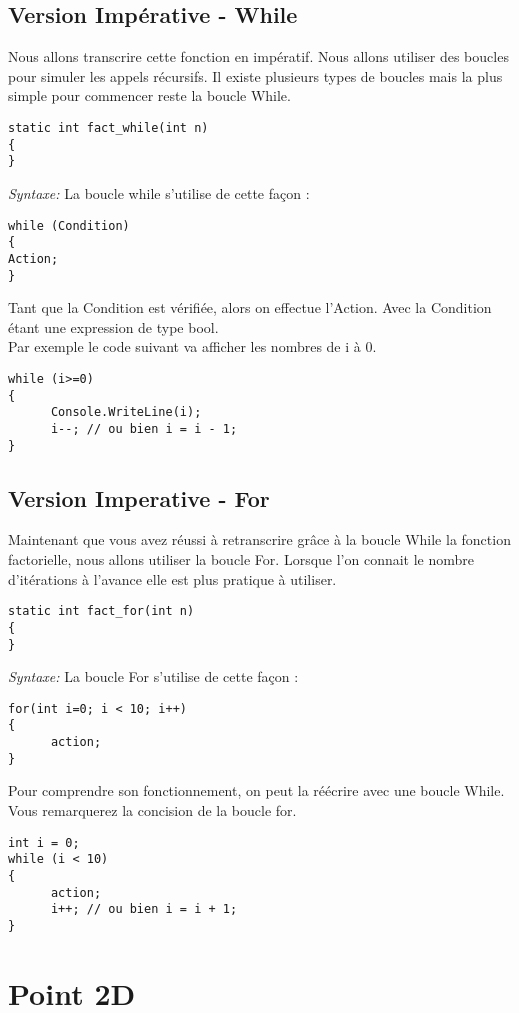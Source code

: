 \documentclass[12pt,a4paper]{report}
\begin{document}
\subsection{Version Impérative - While}
Nous allons transcrire cette fonction en impératif. Nous allons utiliser des boucles
pour simuler les appels récursifs. Il existe plusieurs types de boucles mais la
plus simple pour commencer reste la boucle While.
\begin{lstlisting}
static int fact_while(int n)
{
}
\end{lstlisting}
\emph{Syntaxe: } La boucle while s’utilise de cette façon :
\begin{lstlisting}
while (Condition) 
{
Action;
}
\end{lstlisting}
Tant que la Condition est vérifiée, alors on effectue l’Action. Avec la Condition
étant une expression de type bool.\\
Par exemple le code suivant va afficher
les nombres de i à 0.
\begin{lstlisting}
while (i>=0) 
{
      Console.WriteLine(i);
      i--; // ou bien i = i - 1;
}
\end{lstlisting}
\subsection{Version Imperative - For}
Maintenant que vous avez réussi à retranscrire grâce à la boucle While la
fonction factorielle, nous allons utiliser la boucle For. Lorsque l’on connait
le nombre d’itérations à l’avance elle est plus pratique à utiliser.
\begin{lstlisting}
static int fact_for(int n)
{
}
\end{lstlisting}

\emph{Syntaxe: } La boucle For s’utilise de cette façon :
\begin{lstlisting}
for(int i=0; i < 10; i++)
{
      action;
}
\end{lstlisting}
Pour comprendre son fonctionnement, on peut la réécrire avec une boucle
While. Vous remarquerez la concision de la boucle for.
\begin{lstlisting}
int i = 0;
while (i < 10) 
{
      action;
      i++; // ou bien i = i + 1;
}
\end{lstlisting}
\section{Point 2D}
\end{document}
